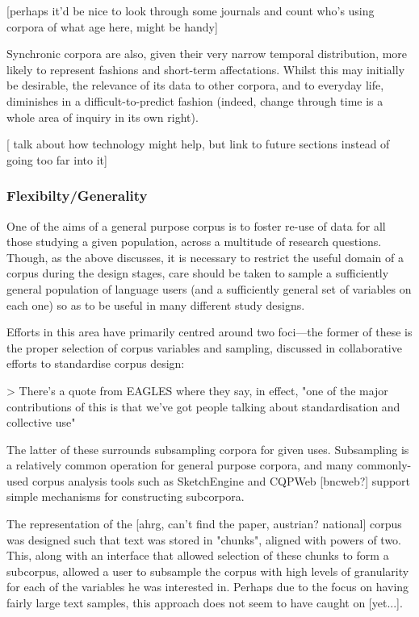 [perhaps it'd be nice to look through some journals and count who's using corpora of what age here, might be handy]

Synchronic corpora are also, given their very narrow temporal distribution, more likely to represent fashions and short-term affectations.  Whilst this may initially be desirable, the relevance of its data to other corpora, and to everyday life, diminishes in a difficult-to-predict fashion (indeed, change through time is a whole area of inquiry in its own right).

[ talk about how technology might help, but link to future sections instead of going too far into it]




\subsubsection{Flexibilty/Generality}
One of the aims of a general purpose corpus is to foster re-use of data for all those studying a given population, across a multitude of research questions.  Though, as the above discusses, it is necessary to restrict the useful domain of a corpus during the design stages, care should be taken to sample a sufficiently general population of language users (and a sufficiently general set of variables on each one) so as to be useful in many different study designs.

Efforts in this area have primarily centred around two foci---the former of these is the proper selection of corpus variables and sampling, discussed in collaborative efforts to standardise corpus design:

> There's a quote from EAGLES where they say, in effect, "one of the major contributions of this is that we've got people talking about standardisation and collective use"


The latter of these surrounds subsampling corpora for given uses.  Subsampling is a relatively common operation for general purpose corpora, and many commonly-used corpus analysis tools such as SketchEngine and CQPWeb [bncweb?] support simple mechanisms for constructing subcorpora.

The representation of the [ahrg, can't find the paper, austrian? national] corpus was designed such that text was stored in "chunks", aligned with powers of two.  This, along with an interface that allowed selection of these chunks to form a subcorpus, allowed a user to subsample the corpus with high levels of granularity for each of the variables he was interested in.  Perhaps due to the focus on having fairly large text samples, this approach does not seem to have caught on [yet...].




